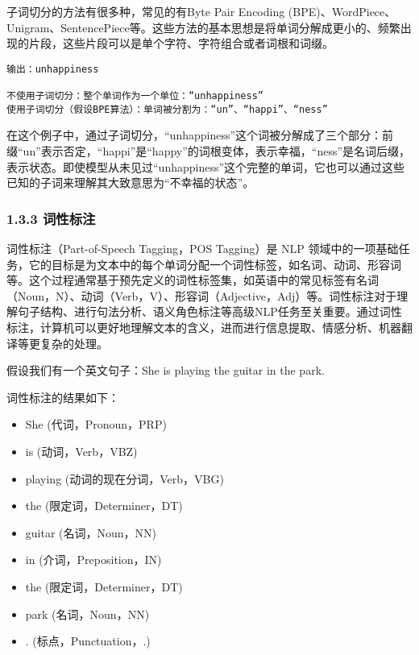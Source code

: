 \documentclass[
]{article}
\providecommand{\tightlist}{%
  \setlength{\itemsep}{0pt}\setlength{\parskip}{0pt}}
\begin{document}
子词切分的方法有很多种，常见的有Byte Pair Encoding
(BPE)、WordPiece、Unigram、SentencePiece等。这些方法的基本思想是将单词分解成更小的、频繁出现的片段，这些片段可以是单个字符、字符组合或者词根和词缀。

\begin{verbatim}
输出：unhappiness

不使用子词切分：整个单词作为一个单位：“unhappiness”
使用子词切分（假设BPE算法）：单词被分割为：“un”、“happi”、“ness”
\end{verbatim}

在这个例子中，通过子词切分，``unhappiness''这个词被分解成了三个部分：前缀``un''表示否定，``happi''是``happy''的词根变体，表示幸福，``ness''是名词后缀，表示状态。即使模型从未见过``unhappiness''这个完整的单词，它也可以通过这些已知的子词来理解其大致意思为``不幸福的状态''。

\subsubsection{1.3.3 词性标注}\label{ux8bcdux6027ux6807ux6ce8}

词性标注（Part-of-Speech Tagging，POS Tagging）是 NLP
领域中的一项基础任务，它的目标是为文本中的每个单词分配一个词性标签，如名词、动词、形容词等。这个过程通常基于预先定义的词性标签集，如英语中的常见标签有名词（Noun，N）、动词（Verb，V）、形容词（Adjective，Adj）等。词性标注对于理解句子结构、进行句法分析、语义角色标注等高级NLP任务至关重要。通过词性标注，计算机可以更好地理解文本的含义，进而进行信息提取、情感分析、机器翻译等更复杂的处理。

假设我们有一个英文句子：She is playing the guitar in the park.

词性标注的结果如下：

\begin{itemize}
\tightlist
\item
  She (代词，Pronoun，PRP)
\item
  is (动词，Verb，VBZ)
\item
  playing (动词的现在分词，Verb，VBG)
\item
  the (限定词，Determiner，DT)
\item
  guitar (名词，Noun，NN)
\item
  in (介词，Preposition，IN)
\item
  the (限定词，Determiner，DT)
\item
  park (名词，Noun，NN)
\item
  . (标点，Punctuation，.)
\end{itemize}
\end{document}
